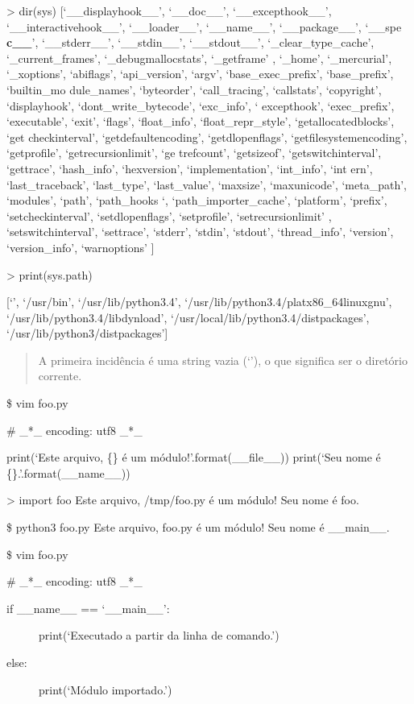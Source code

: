 \documentclass[letterpaper,10pt,brazil]{sphinxmanual}
\begin{document}
\textgreater{} dir(sys)
{[}‘\_\_displayhook\_\_’, ‘\_\_doc\_\_’, ‘\_\_excepthook\_\_’, ‘\_\_interactivehook\_\_’, ‘\_\_loader\_\_’, ‘\_\_name\_\_’, ‘\_\_package\_\_’, ‘\_\_spe
{\color{red}\bfseries{}c\_\_}’, ‘\_\_stderr\_\_’, ‘\_\_stdin\_\_’, ‘\_\_stdout\_\_’, ‘\_clear\_type\_cache’, ‘\_current\_frames’, ‘\_debugmallocstats’, ‘\_getframe’
, ‘\_home’, ‘\_mercurial’, ‘\_xoptions’, ‘abiflags’, ‘api\_version’, ‘argv’, ‘base\_exec\_prefix’, ‘base\_prefix’, ‘builtin\_mo
dule\_names’, ‘byteorder’, ‘call\_tracing’, ‘callstats’, ‘copyright’, ‘displayhook’, ‘dont\_write\_bytecode’, ‘exc\_info’, ‘
excepthook’, ‘exec\_prefix’, ‘executable’, ‘exit’, ‘flags’, ‘float\_info’, ‘float\_repr\_style’, ‘getallocatedblocks’, ‘get
checkinterval’, ‘getdefaultencoding’, ‘getdlopenflags’, ‘getfilesystemencoding’, ‘getprofile’, ‘getrecursionlimit’, ‘ge
trefcount’, ‘getsizeof’, ‘getswitchinterval’, ‘gettrace’, ‘hash\_info’, ‘hexversion’, ‘implementation’, ‘int\_info’, ‘int
ern’, ‘last\_traceback’, ‘last\_type’, ‘last\_value’, ‘maxsize’, ‘maxunicode’, ‘meta\_path’, ‘modules’, ‘path’, ‘path\_hooks
‘, ‘path\_importer\_cache’, ‘platform’, ‘prefix’, ‘setcheckinterval’, ‘setdlopenflags’, ‘setprofile’, ‘setrecursionlimit’
, ‘setswitchinterval’, ‘settrace’, ‘stderr’, ‘stdin’, ‘stdout’, ‘thread\_info’, ‘version’, ‘version\_info’, ‘warnoptions’
{]}

\textgreater{} print(sys.path)

{[}‘’, ‘/usr/bin’, ‘/usr/lib/python3.4’, ‘/usr/lib/python3.4/plat\sphinxhyphen{}x86\_64\sphinxhyphen{}linux\sphinxhyphen{}gnu’, ‘/usr/lib/python3.4/lib\sphinxhyphen{}dynload’, ‘/usr/local/lib/python3.4/dist\sphinxhyphen{}packages’, ‘/usr/lib/python3/dist\sphinxhyphen{}packages’{]}
\begin{quote}

A primeira incidência é uma string vazia (‘’), o que significa ser o diretório corrente.
\end{quote}

\$ vim foo.py

\# \_*\_ encoding: utf\sphinxhyphen{}8 \_*\_

print(‘Este arquivo, \{\} é um módulo!’.format(\_\_file\_\_))
print(‘Seu nome é \{\}.’.format(\_\_name\_\_))

\textgreater{} import foo
Este arquivo, /tmp/foo.py é um módulo!
Seu nome é foo.

\$ python3 foo.py
Este arquivo, foo.py é um módulo!
Seu nome é \_\_main\_\_.

\$ vim foo.py

\# \_*\_ encoding: utf\sphinxhyphen{}8 \_*\_
\begin{description}
\item[{if \_\_name\_\_ == ‘\_\_main\_\_’:}] \leavevmode
print(‘Executado a partir da linha de comando.’)

\item[{else:}] \leavevmode
print(‘Módulo importado.’)

\end{description}
\end{document}
